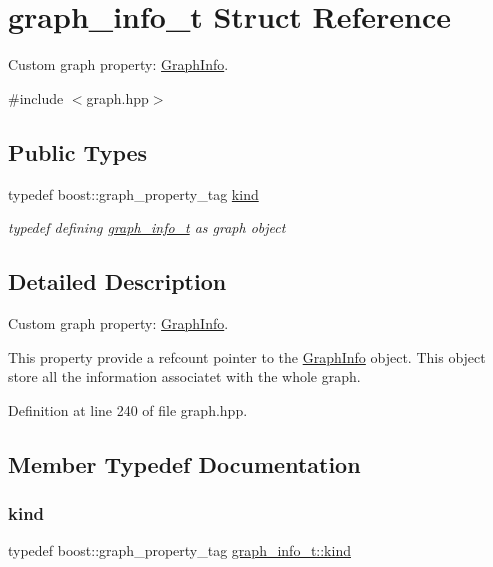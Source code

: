 \hypertarget{structgraph__info__t}{}\section{graph\+\_\+info\+\_\+t Struct Reference}
\label{structgraph__info__t}


Custom graph property\+: \hyperlink{structGraphInfo}{Graph\+Info}.  




{\ttfamily \#include $<$graph.\+hpp$>$}

\subsection*{Public Types}
\begin{DoxyCompactItemize}
\item 
typedef boost\+::graph\+\_\+property\+\_\+tag \hyperlink{structgraph__info__t_acc084742782a68b2282e935a8f6f1a31}{kind}
\begin{DoxyCompactList}\small\item\em typedef defining \hyperlink{structgraph__info__t}{graph\+\_\+info\+\_\+t} as graph object \end{DoxyCompactList}\end{DoxyCompactItemize}


\subsection{Detailed Description}
Custom graph property\+: \hyperlink{structGraphInfo}{Graph\+Info}. 

This property provide a refcount pointer to the \hyperlink{structGraphInfo}{Graph\+Info} object. This object store all the information associatet with the whole graph. 

Definition at line 240 of file graph.\+hpp.



\subsection{Member Typedef Documentation}
\mbox{\label{structgraph__info__t_acc084742782a68b2282e935a8f6f1a31}} 
\subsubsection{\texorpdfstring{kind}{kind}}
{\footnotesize\ttfamily typedef boost\+::graph\+\_\+property\+\_\+tag \hyperlink{structgraph__info__t_acc084742782a68b2282e935a8f6f1a31}{graph\+\_\+info\+\_\+t\+::kind}}



